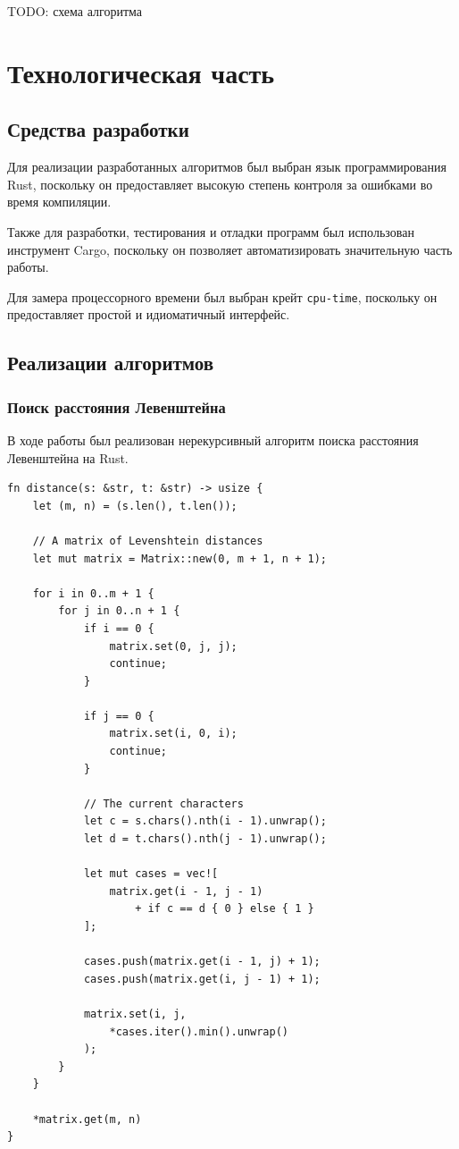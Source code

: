 \documentclass{report}
\begin{document}
TODO: схема алгоритма

\chapter{Технологическая часть}

\section{Средства разработки}

Для реализации разработанных алгоритмов был выбран язык
программирования Rust, поскольку он предоставляет высокую степень
контроля за ошибками во время компиляции.

Также для разработки, тестирования и отладки программ был
использован инструмент Cargo, поскольку он позволяет
автоматизировать значительную часть работы.

Для замера процессорного времени был выбран крейт
\texttt{cpu-time}, поскольку он предоставляет простой и
идиоматичный интерфейс.

\section{Реализации алгоритмов}

\subsection{Поиск расстояния Левенштейна}

В ходе работы был реализован нерекурсивный алгоритм поиска
расстояния Левенштейна на Rust.

\begin{lstlisting}[caption=Реализация нерекурсивного алгоритма]
fn distance(s: &str, t: &str) -> usize {
    let (m, n) = (s.len(), t.len());

    // A matrix of Levenshtein distances
    let mut matrix = Matrix::new(0, m + 1, n + 1);

    for i in 0..m + 1 {
        for j in 0..n + 1 {
            if i == 0 {
                matrix.set(0, j, j);
                continue;
            }

            if j == 0 {
                matrix.set(i, 0, i);
                continue;
            }

            // The current characters
            let c = s.chars().nth(i - 1).unwrap();
            let d = t.chars().nth(j - 1).unwrap();

            let mut cases = vec![
                matrix.get(i - 1, j - 1)
                    + if c == d { 0 } else { 1 }
            ];

            cases.push(matrix.get(i - 1, j) + 1);
            cases.push(matrix.get(i, j - 1) + 1);

            matrix.set(i, j,
                *cases.iter().min().unwrap()
            );
        }
    }

    *matrix.get(m, n)
}
\end{lstlisting}
\end{document}
